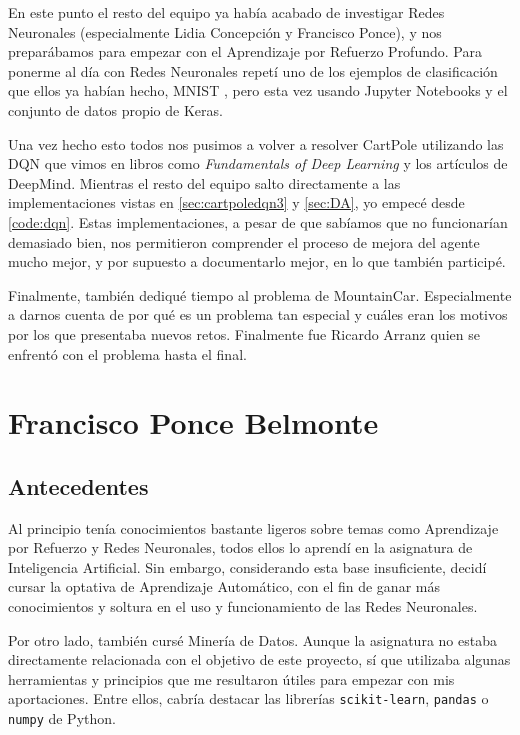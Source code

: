 En este punto el resto del equipo ya había acabado de investigar Redes Neuronales (especialmente Lidia Concepción y Francisco Ponce), y nos preparábamos para empezar con el Aprendizaje por Refuerzo Profundo. Para ponerme al día con Redes Neuronales repetí uno de los ejemplos de clasificación que ellos ya habían hecho, MNIST \citep{MNISTKeras}, pero esta vez usando Jupyter Notebooks y el conjunto de datos propio de Keras.

Una vez hecho esto todos nos pusimos a volver a resolver CartPole utilizando las DQN que vimos en libros como \textit{Fundamentals of Deep Learning} \citep{Buduma:general} y los artículos de DeepMind. Mientras el resto del equipo salto directamente a las implementaciones vistas en \ref{sec:cartpoledqn3} y \ref{sec:DA}, yo empecé desde \ref{code:dqn}. Estas implementaciones, a pesar de que sabíamos que no funcionarían demasiado bien, nos permitieron comprender el proceso de mejora del agente mucho mejor, y por supuesto a documentarlo mejor, en lo que también participé.

Finalmente, también dediqué tiempo al problema de MountainCar. Especialmente a darnos cuenta de por qué es un problema tan especial y cuáles eran los motivos por los que presentaba nuevos retos. Finalmente fue Ricardo Arranz quien se enfrentó con el problema hasta el final.

\section{Francisco Ponce Belmonte}


\subsection{Antecedentes}

Al principio tenía conocimientos bastante ligeros sobre temas como Aprendizaje por Refuerzo y Redes Neuronales, todos ellos lo aprendí en la asignatura de Inteligencia Artificial. Sin embargo, considerando esta base insuficiente, decidí cursar la optativa de Aprendizaje Automático, con el fin de ganar más conocimientos y soltura en el uso y funcionamiento de las Redes Neuronales.

Por otro lado, también cursé Minería de Datos. Aunque la asignatura no estaba directamente relacionada con el objetivo de este proyecto, sí que utilizaba algunas herramientas y principios que me resultaron útiles para empezar con mis aportaciones. Entre ellos, cabría destacar las librerías \texttt{scikit-learn}, \texttt{pandas} o \texttt{numpy} de Python. 


